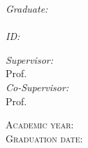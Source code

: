 \begin{titlingpage}
\begin{center}
		\begin{minipage}[t]{0.3\textwidth}
			\begin{flushleft} \large
				\emph{Graduate:}\\
				\textcolor{SchoolColor}{\AuthorName \ \textsc{\AuthorSurname}} %
				\\
				\emph{ID:} \textsc{\StudentId}
			\end{flushleft}
		\end{minipage}
		\begin{minipage}[t]{0.68\textwidth}
			\begin{flushright} \large
				\emph{Supervisor:} \\
				\textcolor{SchoolColor}{Prof. \SupName \ \textsc{\SupSurname}} %
				\vspace{10pt}\\
				\emph{Co-Supervisor:} \\
				\textcolor{SchoolColor}{Prof. \CosupName \ \textsc{\CosupSurname}} %
			\end{flushright}
		\end{minipage}

		\vfill
		\large{\textsc{Academic year:} \quad \AcademicYear}\\
		\large{\textsc{Graduation date:} \quad \GraduationDate}
	\end{center}
\end{titlingpage}
